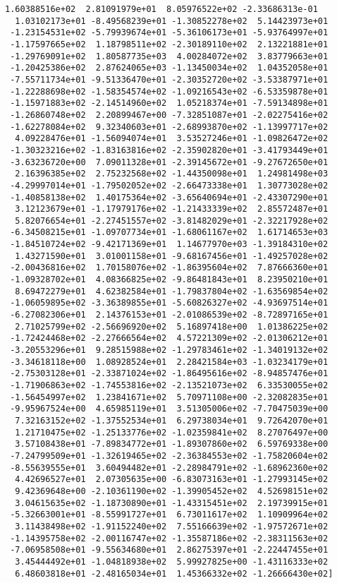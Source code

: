 \documentclass[11pt]{article}
\begin{document}
\begin{Verbatim}[commandchars=\\\{\}]
  1.60388516e+02  2.81091979e+01  8.05976522e+02 -2.33686313e-01
  1.03102173e+01 -8.49568239e+01 -1.30852278e+02  5.14423973e+01
 -1.23154531e+02 -5.79939674e+01 -5.36106173e+01 -5.93764997e+01
 -1.17597665e+02  1.18798511e+02 -2.30189110e+02  2.13221881e+01
 -1.29769091e+02  1.80587735e+03  4.00284072e+02  3.83779663e+01
 -1.20425386e+02  2.87624065e+03 -1.13450034e+02  1.04352058e+01
 -7.55711734e+01 -9.51336470e+01 -2.30352720e+02 -3.53387971e+01
 -1.22288698e+02 -1.58354574e+02 -1.09216543e+02 -6.53359878e+01
 -1.15971883e+02 -2.14514960e+02  1.05218374e+01 -7.59134898e+01
 -1.26860748e+02  2.20899467e+00 -7.32851087e+01 -2.02275416e+02
 -1.62278084e+02  9.32340603e+01 -2.68993870e+02 -1.13997717e+02
  4.09228476e+01 -1.56094074e+01  3.53527246e+01 -1.09826472e+02
 -1.30323216e+02 -1.83163816e+02 -2.35902820e+01 -3.41793449e+01
 -3.63236720e+00  7.09011328e+01 -2.39145672e+01 -9.27672650e+01
  2.16396385e+02  2.75232568e+02 -1.44350098e+01  1.24981498e+03
 -4.29997014e+01 -1.79502052e+02 -2.66473338e+01  1.30773028e+02
 -1.40858138e+02  1.40175364e+02 -3.65640694e+01 -2.43307290e+01
  3.12123679e+01 -1.17979176e+02 -1.21433339e+02  2.85572487e+01
  5.82076654e+01 -2.27451557e+02 -3.81482029e+01 -2.32217928e+02
 -6.34508215e+01 -1.09707734e+01 -1.68061167e+02  1.61714653e+03
 -1.84510724e+02 -9.42171369e+01  1.14677970e+03 -1.39184310e+02
  1.43271590e+01  3.01001158e+01 -9.68167456e+01 -1.49257028e+02
 -2.00436816e+02  1.70158076e+02 -1.86395604e+02  7.87666360e+01
 -1.09328702e+01  4.08366825e+02 -9.86481843e+01  8.23950210e+01
  8.69472279e+01  4.62382584e+01 -1.79837804e+02 -1.63569854e+02
 -1.06059895e+02 -3.36389855e+01 -5.60826327e+02 -4.93697514e+01
 -6.27082306e+01  2.14376153e+01 -2.01086539e+02 -8.72897165e+01
  2.71025799e+02 -2.56696920e+02  5.16897418e+00  1.01386225e+02
 -1.72424468e+02 -2.27666564e+02  4.57221309e+02 -2.01306212e+01
 -3.20553296e+01  9.28515988e+02 -1.29783461e+02 -1.34019132e+02
 -3.34618118e+00  1.08928524e+01  2.28421584e+03 -1.03234179e+01
 -2.75303128e+01 -2.33871024e+02 -1.86495616e+02 -8.94857476e+01
 -1.71906863e+02 -1.74553816e+02 -2.13521073e+02  6.33530055e+02
 -1.56454997e+02  1.23841671e+02  5.70971108e+00 -2.32082835e+01
 -9.95967524e+00  4.65985119e+01  3.51305006e+02 -7.70475039e+00
  7.32163152e+02 -1.37552534e+01  6.29738034e+01  9.72642070e+01
  1.21710475e+02 -1.25133776e+02 -1.02359841e+02  8.27076497e+00
  3.57108438e+01 -7.89834772e+01 -1.89307860e+02  6.59769338e+00
 -7.24799509e+01 -1.32619465e+02 -2.36384553e+02 -1.75820604e+02
 -8.55639555e+01  3.60494482e+01 -2.28984791e+02 -1.68962360e+02
  4.42696527e+01  2.07305635e+00 -6.83073163e+01 -1.27993145e+02
  9.42369648e+00 -2.10361190e+02 -1.39905452e+02  4.52698151e+02
  3.04615635e+02 -1.18730890e+01 -1.43315451e+02  2.19739915e+01
 -5.32663001e+01 -8.55991727e+01  6.73011617e+02  1.10909964e+02
  3.11438498e+02 -1.91152240e+02  7.55166639e+02 -1.97572671e+02
 -1.14395758e+02 -2.00116747e+02 -1.35587186e+02 -2.38311563e+02
 -7.06958508e+01 -9.55634680e+01  2.86275397e+01 -2.22447455e+01
  3.45444492e+01 -1.04818938e+02  5.99927825e+00 -1.43116333e+02
  6.48603818e+01 -2.48165034e+01  1.45366332e+02 -1.26666430e+02]

    \end{Verbatim}
\end{document}
